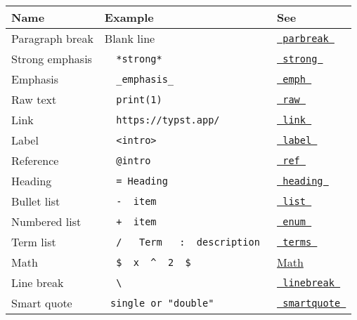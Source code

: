 \begin{longtable}[]{@{}lll@{}}
\toprule\noalign{}
Name & Example & See \\
\midrule\noalign{}
\endhead
\bottomrule\noalign{}
\endlastfoot
Paragraph break & Blank line &
\href{/docs/reference/model/parbreak/}{\texttt{\ parbreak\ }} \\
Strong emphasis & \texttt{\ }{\texttt{\ *strong*\ }}\texttt{\ } &
\href{/docs/reference/model/strong/}{\texttt{\ strong\ }} \\
Emphasis & \texttt{\ }{\texttt{\ \_emphasis\_\ }}\texttt{\ } &
\href{/docs/reference/model/emph/}{\texttt{\ emph\ }} \\
Raw text &
\texttt{\ }{\texttt{\ \textasciigrave{}print(1)\textasciigrave{}\ }}\texttt{\ }
& \href{/docs/reference/text/raw/}{\texttt{\ raw\ }} \\
Link & \texttt{\ }{\texttt{\ https://typst.app/\ }}\texttt{\ } &
\href{/docs/reference/model/link/}{\texttt{\ link\ }} \\
Label &
\texttt{\ }{\texttt{\ \textless{}intro\textgreater{}\ }}\texttt{\ } &
\href{/docs/reference/foundations/label/}{\texttt{\ label\ }} \\
Reference & \texttt{\ }{\texttt{\ @intro\ }}\texttt{\ } &
\href{/docs/reference/model/ref/}{\texttt{\ ref\ }} \\
Heading & \texttt{\ }{\texttt{\ =\ Heading\ }}\texttt{\ } &
\href{/docs/reference/model/heading/}{\texttt{\ heading\ }} \\
Bullet list & \texttt{\ }{\texttt{\ -\ }}\texttt{\ item\ } &
\href{/docs/reference/model/list/}{\texttt{\ list\ }} \\
Numbered list & \texttt{\ }{\texttt{\ +\ }}\texttt{\ item\ } &
\href{/docs/reference/model/enum/}{\texttt{\ enum\ }} \\
Term list &
\texttt{\ }{\texttt{\ /\ }}\texttt{\ }{\texttt{\ Term\ }}\texttt{\ }{\texttt{\ :\ }}\texttt{\ description\ }
& \href{/docs/reference/model/terms/}{\texttt{\ terms\ }} \\
Math &
\texttt{\ }{\texttt{\ \$\ }}\texttt{\ x\ }{\texttt{\ \^{}\ }}\texttt{\ 2\ }{\texttt{\ \$\ }}\texttt{\ }
& \href{/docs/reference/math/}{Math} \\
Line break & \texttt{\ }{\texttt{\ \textbackslash{}\ }}\texttt{\ } &
\href{/docs/reference/text/linebreak/}{\texttt{\ linebreak\ }} \\
Smart quote &
\texttt{\ \textquotesingle{}single\textquotesingle{}\ or\ "double"\ } &
\href{/docs/reference/text/smartquote/}{\texttt{\ smartquote\ }} \\

\end{longtable}
